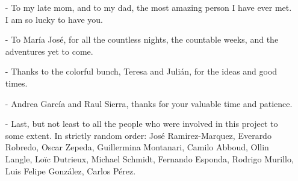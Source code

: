 \begin{acknowledgments}
\begin{itemize}
\setlength{\itemsep}{0pt}
\item[-] To my late mom, and to my dad, the most amazing person I have ever met. I am so lucky to have you.
\item[-] To Mar\'ia Jos\'e, for all the countless nights, the countable weeks, and the adventures yet to come.
\item[-] Thanks to the colorful bunch, Teresa and Juli\'an, for the ideas and good times.
\item[-] Andrea Garc\'ia and Raul Sierra, thanks for your valuable time and patience.
\item[-] Last, but not least to all the people who were involved in this project to some extent. In strictly random order: Jos\'e Ramirez-Marquez, Everardo Robredo, Oscar Zepeda, Guillermina Montanari, Camilo Abboud, Ollin Langle, Lo\"{i}c Dutrieux, Michael Schmidt, Fernando Esponda, Rodrigo Murillo, Luis Felipe Gonz\'alez, Carlos P\'erez.
\end{itemize}
\end{acknowledgments}
